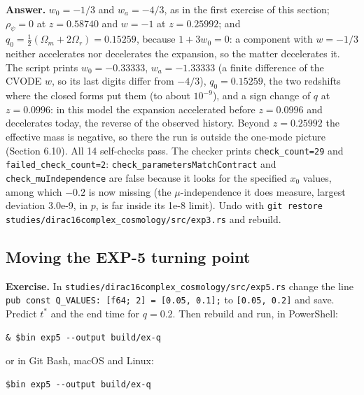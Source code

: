 \documentclass[11pt]{article}
\begin{document}
\textbf{Answer.} $w_0=-1/3$ and $w_a=-4/3$, as in the first exercise of this section; $\rho_\psi=0$ at $z=0.58740$ and $w=-1$ at $z=0.25992$; and $q_0=\frac12(\Omega_m+2\Omega_r)=0.15259$, because $1+3w_0=0$: a component with $w=-1/3$ neither accelerates nor decelerates the expansion, so the matter decelerates it. The script prints $w_0=-0.33333$, $w_a=-1.33333$ (a finite difference of the CVODE $w$, so its last digits differ from $-4/3$), $q_0=0.15259$, the two redshifts where the closed forms put them (to about $10^{-9}$), and a sign change of $q$ at $z=0.0996$: in this model the expansion accelerated before $z=0.0996$ and decelerates today, the reverse of the observed history. Beyond $z=0.25992$ the effective mass is negative, so there the run is outside the one-mode picture (Section 6.10). All 14 self-checks pass. The checker prints \texttt{check\_co\allowbreak{}unt=29} and \texttt{failed\_c\allowbreak{}heck\_cou\allowbreak{}nt=2}: \texttt{check\_pa\allowbreak{}rameters\allowbreak{}MatchCon\allowbreak{}tract} and \texttt{check\_mu\allowbreak{}Independ\allowbreak{}ence} are false because it looks for the specified $x_0$ values, among which $-0.2$ is now missing (the $\mu$-independence it does measure, largest deviation 3.0e-9, in $p$, is far inside its 1e-8 limit). Undo with \texttt{git rest\allowbreak{}ore stud\allowbreak{}ies/dira\allowbreak{}c16compl\allowbreak{}ex\_cosmo\allowbreak{}logy/src\allowbreak{}/exp3.rs} and rebuild.

\subsection{Moving the EXP-5 turning point}

\textbf{Exercise.} In \texttt{studies/\allowbreak{}dirac16c\allowbreak{}omplex\_c\allowbreak{}osmology\allowbreak{}/src/exp\allowbreak{}5.rs} change the line \texttt{pub cons\allowbreak{}t Q\_VALU\allowbreak{}ES: [f64\allowbreak{}; 2] = [\allowbreak{}0.05, 0.\allowbreak{}1];} to \texttt{[0.05, 0\allowbreak{}.2]} and save. Predict $t^*$ and the end time for $q=0.2$. Then rebuild and run, in PowerShell:

\begin{Verbatim}[fontsize=\small]
& $bin exp5 --output build/ex-q
\end{Verbatim}

or in Git Bash, macOS and Linux:

\begin{Verbatim}[fontsize=\small]
$bin exp5 --output build/ex-q
\end{Verbatim}
\end{document}
